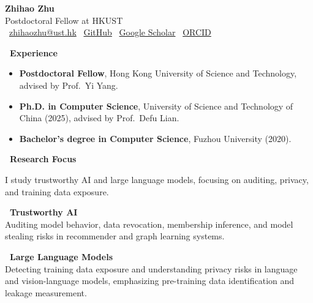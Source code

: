 \documentclass[10pt]{article}
\newcommand{\sectionline}{\par\vspace{4pt}{\color{linecolor}\hrule height 0.6pt}\par\vspace{6pt}}
\begin{document}
\begin{tcolorbox}[
  enhanced,
  colback=primary,
  colframe=primary,
  boxrule=0pt,
  arc=0pt,
  left=0pt, right=0pt, top=10pt, bottom=10pt,
  boxsep=0pt,
  width=\linewidth+3.2cm,
  enlarge left by=-1.6cm,
  enlarge right by=-1.6cm,
]
\begin{center}
  {\fontsize{26}{30}\selectfont\color{white}\textbf{Zhihao Zhu}}\\[4pt]
  {\normalsize\color{white!90}Postdoctoral Fellow at HKUST}\\[8pt]
  {\color{white!80}\small
    ~\href{mailto:zhihaozhu@ust.hk}{zhihaozhu@ust.hk} \quad
    ~\href{https://github.com/zzh9568}{GitHub} \quad
    ~\href{https://scholar.google.com/citations?user=745H-yoAAAAJ}{Google Scholar} \quad
    ~\href{https://orcid.org/0000-0001-5814-1939}{ORCID}
  }
\end{center}
\end{tcolorbox}

\vspace{6pt}

\textbf{\normalsize\color{primary}~Experience}
\sectionline
\begin{itemize}[leftmargin=1.2em, itemsep=2pt, topsep=0pt, parsep=0pt]
  \item {\small\textbf{Postdoctoral Fellow}}, Hong Kong University of Science and Technology, advised by Prof.~Yi Yang.
  \item {\small\textbf{Ph.D. in Computer Science}}, University of Science and Technology of China (2025), advised by Prof.~Defu Lian.
  \item {\small\textbf{Bachelor's degree in Computer Science}}, Fuzhou University (2020).
\end{itemize}

\vspace{4pt}

\textbf{\normalsize\color{primary}~Research Focus}
\sectionline
{\small I study trustworthy AI and large language models, focusing on auditing, privacy, and training data exposure.}

\vspace{2pt}

\begin{multicols}{2}
\noindent\textbf{\small\color{primary}~Trustworthy AI}\\[2pt]
{\small Auditing model behavior, data revocation, membership inference, and model stealing risks in recommender and graph learning systems.}

\columnbreak

\noindent\textbf{\small\color{primary}~Large Language Models}\\[2pt]
{\small Detecting training data exposure and understanding privacy risks in language and vision-language models, emphasizing pre-training data identification and leakage measurement.}
\end{multicols}
\end{document}
